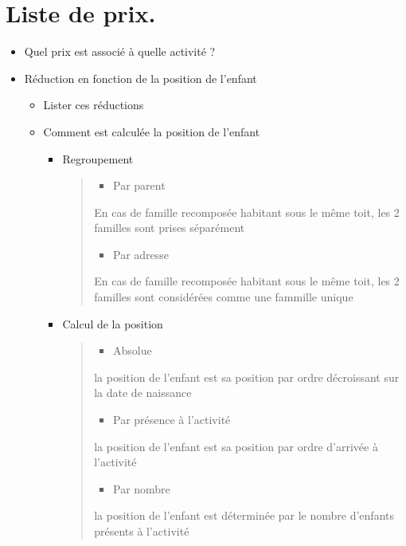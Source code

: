 \documentclass[letterpaper,10pt,english]{sphinxmanual}
\begin{document}
\section{Liste de prix.}
\label{checklist:liste-de-prix}\begin{itemize}
\item {} 
Quel prix est associé à quelle activité ?

\item {} 
Réduction en fonction de la position de l'enfant
\begin{itemize}
\item {} 
Lister ces réductions

\item {} 
Comment est calculée la position de l'enfant
\begin{itemize}
\item {} 
Regroupement
\begin{quote}
\begin{itemize}
\item {} 
Par parent

\end{itemize}

En cas de famille recomposée habitant sous le même toit, les 2 familles sont prises séparément
\begin{itemize}
\item {} 
Par adresse

\end{itemize}

En cas de famille recomposée habitant sous le même toit, les 2 familles sont considérées comme une fammille unique
\end{quote}

\item {} 
Calcul de la position
\begin{quote}
\begin{itemize}
\item {} 
Absolue

\end{itemize}

la position de l'enfant est sa position par ordre décroissant sur la date de naissance
\begin{itemize}
\item {} 
Par présence à l'activité

\end{itemize}

la position de l'enfant est sa position par ordre d'arrivée à l'activité
\begin{itemize}
\item {} 
Par nombre

\end{itemize}

la position de l'enfant est déterminée par le nombre d'enfants présents à l'activité
\end{quote}

\end{itemize}

\end{itemize}

\end{itemize}
\end{document}
